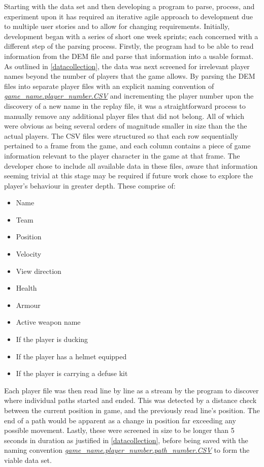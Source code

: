\documentclass[journal]{IEEEtran}
\begin{document}
Starting with the data set and then developing a program to parse, process, and experiment upon it has required an iterative agile approach to development due to multiple user stories and to allow for changing requirements. Initially, development began with a series of short one week sprints; each concerned with a different step of the parsing process. Firstly, the program had to be able to read information from the DEM file and parse that information into a usable format. As outlined in \ref{datacollection}, the data was next screened for irrelevant player names beyond the number of players that the game allows. By parsing the DEM files into separate player files with an explicit naming convention of \textit{\url{game_name.player_number.CSV}} and incrementing the player number upon the discovery of a new name in the replay file, it was a straightforward process to manually remove any additional player files that did not belong. All of which were obvious as being several orders of magnitude smaller in size than the the actual players. The CSV files were structured so that each row sequentially pertained to a frame from the game, and each column contains a piece of game information relevant to the player character in the game at that frame. The developer chose to include all available data in these files, aware that information seeming trivial at this stage may be required if future work chose to explore the player's behaviour in greater depth. These comprise of:
\begin{itemize}
    \item Name
    \item Team
    \item Position
    \item Velocity
    \item View direction
    \item Health
    \item Armour
    \item Active weapon name
    \item If the player is ducking
    \item If the player has a helmet equipped
    \item If the player is carrying a defuse kit
\end{itemize}

Each player file was then read line by line as a stream by the program to discover where individual paths started and ended. This was detected by a distance check between the current position in game, and the previously read line's position. The end of a path would be apparent as a change in position far exceeding any possible movement. Lastly, these were screened in size to be longer than 5 seconds in duration as justified in \ref{datacollection}, before being saved with the naming convention \textit{\url{game_name.player_number.path_number.CSV}} to form the viable data set.
\end{document}
